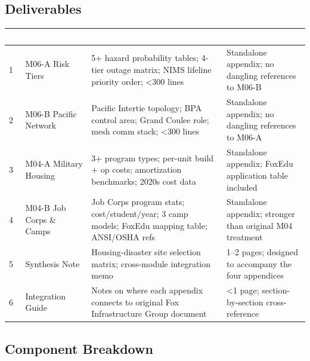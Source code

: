\documentclass[11pt,letterpaper]{article}
\newcommand{\tableheader}[1]{\textbf{\sffamily\textcolor{white}{#1}}}
\begin{document}
\subsection{Deliverables}

\begin{center}
\begin{tabularx}{\textwidth}{C{0.8cm}L{3cm}L{4cm}X}
\toprule
{}
\tableheader{\#} & \tableheader{Deliverable} & \tableheader{Acceptance Criteria} & \tableheader{Spec} \\
 & M06-A Risk Tiers & 5+ hazard probability tables; 4-tier outage matrix; NIMS lifeline priority order; \textless300 lines & Standalone appendix; no dangling references to M06-B \\
2 & M06-B Pacific Network & Pacific Intertie topology; BPA control area; Grand Coulee role; mesh comm stack; \textless300 lines & Standalone appendix; no dangling references to M06-A \\
3 & M04-A Military Housing & 3+ program types; per-unit build + op costs; amortization benchmarks; 2020s cost data & Standalone appendix; FoxEdu application table included \\
4 & M04-B Job Corps \& Camps & Job Corps program stats; cost/student/year; 3 camp models; FoxEdu mapping table; ANSI/OSHA refs & Standalone appendix; stronger than original M04 treatment \\
5 & Synthesis Note & Housing-disaster site selection matrix; cross-module integration memo & 1--2 pages; designed to accompany the four appendices \\
6 & Integration Guide & Notes on where each appendix connects to original Fox Infrastructure Group document & \textless1 page; section-by-section cross-reference \\
\bottomrule
\end{tabularx}
\end{center}

\subsection{Component Breakdown}
\end{document}

